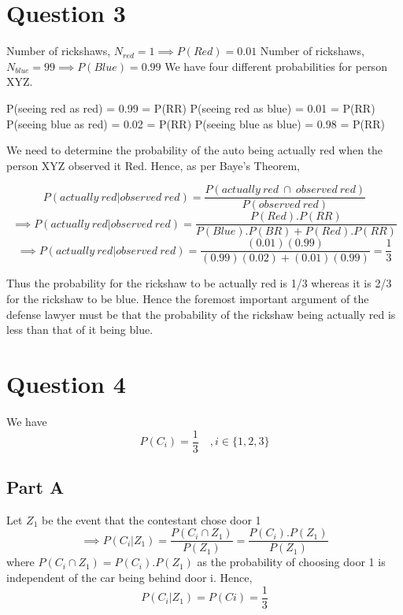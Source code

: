 \documentclass[12pt]{article}
\begin{document}
\section{Question 3}
Number of rickshaws, $N_{red} = 1 \implies P(Red)=0.01$ \newline
Number of rickshaws, $N_{blue} = 99 \implies P(Blue)=0.99$ \newline
We have four different probabilities for person XYZ.
\begin{center}
P(seeing red as red) = 0.99 = P(RR)
\newline P(seeing red as blue) = 0.01 = P(RR)
\newline P(seeing blue as red) = 0.02 = P(RR)
\newline P(seeing blue as blue) = 0.98 = P(RR)\newline 
\end{center}
We need to determine the probability of the auto being actually red when the person XYZ observed it Red. \newline\newline
Hence, as per Baye's Theorem,
\begin{center}
$$P(actually \ red | observed \ red) = \frac{P(actually \ red \ \cap \ observed \ red)}{P(observed \ red)} $$
$$\implies P(actually \ red | observed \ red) = \frac{P(Red).P(RR)}{P(Blue).P(BR) + P(Red).P(RR)} $$
$$\implies P(actually \ red | observed \ red) = \frac{(0.01)(0.99)}{(0.99)(0.02) + (0.01)(0.99)}  = \frac{1}{3}$$
\end{center}
Thus the probability for the rickshaw to be actually red is 1/3 whereas it is 2/3 for the rickshaw to be blue.\newline\newline
Hence the foremost important argument of the defense lawyer must be that the probability of the rickshaw being actually red is less than that of it being blue.


\newpage
\section{Question 4}
We have 
$$P(C_i)=\frac{1}{3} \quad ,i \in \{1,2,3\}$$
\subsection*{Part A}
Let $Z_1$ be the event that the contestant chose door 1
$$\implies P(C_i | Z_1) = \frac{P(C_i \cap Z_1)}{P(Z_1)} = \frac{P(C_i).P(Z_1)}{P(Z_1)}$$
where $P(C_i \cap Z_1) = P(C_i).P(Z_1)$ as the probability of choosing door 1 is independent of the car being behind door i.\newline
Hence,
$$P(C_i|Z_1) = P(Ci) = \frac{1}{3}$$
\end{document}
